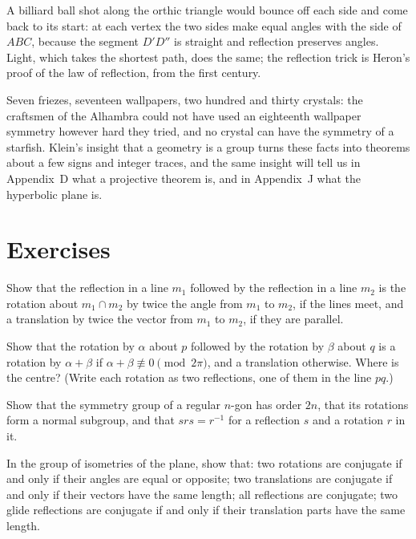 A billiard ball shot along the orthic triangle would bounce off each side and come back to its start: at each vertex the two sides make
equal angles with the side of $ABC$, because the segment $D'D''$ is straight and reflection preserves angles. Light, which takes the
shortest path, does the same; the reflection trick is Heron's proof of the law of reflection, from the first century.

\begin{beauty}
Seven friezes, seventeen wallpapers, two hundred and thirty crystals: the craftsmen of the Alhambra could not have used an eighteenth
wallpaper symmetry however hard they tried, and no crystal can have the symmetry of a starfish. Klein's insight that a geometry is a
group turns these facts into theorems about a few signs and integer traces, and the same insight will tell us in Appendix~D
what a projective theorem is, and in Appendix~J what the hyperbolic plane is.
\end{beauty}

\section{Exercises}

\begin{exercise}[$\star$]\label{geometry:ex:chasles}
Show that the reflection in a line $m_1$ followed by the reflection in a line $m_2$ is the rotation about $m_1\cap m_2$ by twice the angle
from $m_1$ to $m_2$, if the lines meet, and a translation by twice the vector from $m_1$ to $m_2$, if they are parallel.
\end{exercise}

\begin{exercise}[$\star$]\label{geometry:ex:tworotations}
Show that the rotation by $\alpha$ about $p$ followed by the rotation by $\beta$ about $q$ is a rotation by $\alpha+\beta$ if
$\alpha+\beta\not\equiv0\pmod{2\pi}$, and a translation otherwise. Where is the centre? (Write each rotation as two reflections, one of them in
the line $pq$.)
\end{exercise}

\begin{exercise}[$\star$]\label{geometry:ex:dihedral}
Show that the symmetry group of a regular $n$-gon has order $2n$, that its rotations form a normal subgroup, and that $srs=r^{-1}$ for a
reflection $s$ and a rotation $r$ in it.
\end{exercise}

\begin{exercise}[$\star\star$]\label{geometry:ex:conjugacy}
In the group of isometries of the plane, show that: two rotations are conjugate if and only if their angles are equal or opposite; two
translations are conjugate if and only if their vectors have the same length; all reflections are conjugate; two glide reflections are
conjugate if and only if their translation parts have the same length.
\end{exercise}

